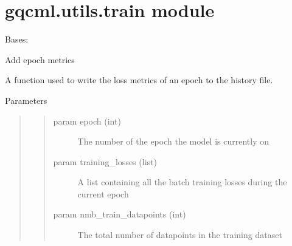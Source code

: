 \documentclass[letterpaper,10pt,english]{sphinxmanual}
\begin{document}
\section{gqcml.utils.train module}
\label{\detokenize{modules/gqcml.utils:module-gqcml.utils.train}}\label{\detokenize{modules/gqcml.utils:gqcml-utils-train-module}}

\begin{fulllineitems}
\label{\detokenize{modules/gqcml.utils:gqcml.utils.train.model_logger}}
Bases: 

\begin{fulllineitems}
\label{\detokenize{modules/gqcml.utils:gqcml.utils.train.model_logger.add_epoch_metrics}}
Add epoch metrics

A function used to write the loss metrics of an epoch to the history file.

Parameters
\begin{quote}
\begin{quote}\begin{description}
\item[{param epoch (int)}] \leavevmode
The number of the epoch the model is currently on

\item[{param training\_losses (list)}] \leavevmode
A list containing all the batch training losses during the current epoch

\item[{param nmb\_train\_datapoints (int)}] \leavevmode
The total number of datapoints in the training dataset


\end{description}
\end{quote}
\end{quote}
\end{fulllineitems}
\end{fulllineitems}
\end{document}
